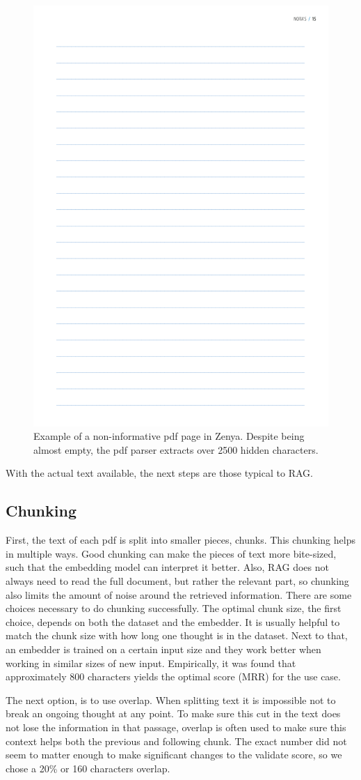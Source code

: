 \begin{figure}[H]
    \centerline{\includegraphics[width=0.5\linewidth]{fig/pdf_clutter.png}}
    \caption{Example of a non-informative pdf page in Zenya. Despite being almost empty, the pdf parser extracts over 2500 hidden characters.}
    \label{fig:pdf_clutter}
\end{figure}

With the actual text available, the next steps are those typical to RAG. 

\subsection{Chunking}
First, the text of each pdf is split into smaller pieces, chunks. This chunking helps in multiple ways. Good chunking can make the pieces of text more bite-sized, such that the embedding model can interpret it better. Also, RAG does not always need to read the full document, but rather the relevant part, so chunking also limits the amount of noise around the retrieved information. There are some choices necessary to do chunking successfully. The optimal chunk size, the first choice, depends on both the dataset and the embedder. It is usually helpful to match the chunk size with how long one thought is in the dataset. Next to that, an embedder is trained on a certain input size and they work better when working in similar sizes of new input. Empirically, it was found that approximately 800 characters yields the optimal score (MRR) for the use case. 

The next option, is to use overlap. When splitting text it is impossible not to break an ongoing thought at any point. To make sure this cut in the text does not lose the information in that passage, overlap is often used to make sure this context helps both the previous and following chunk. The exact number did not seem to matter enough to make significant changes to the validate score, so we chose a 20\% or 160 characters overlap.


